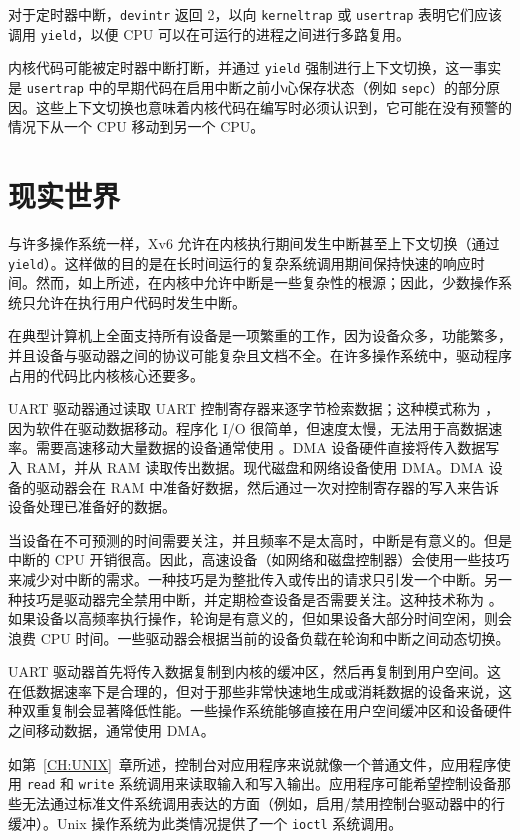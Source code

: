 对于定时器中断，{\tt devintr} 返回 2，以向 {\tt kerneltrap} 或 {\tt usertrap} 表明它们应该调用 {\tt yield}，以便 CPU 可以在可运行的进程之间进行多路复用。

内核代码可能被定时器中断打断，并通过 {\tt yield} 强制进行上下文切换，这一事实是 {\tt usertrap} 中的早期代码在启用中断之前小心保存状态（例如 {\tt sepc}）的部分原因。这些上下文切换也意味着内核代码在编写时必须认识到，它可能在没有预警的情况下从一个 CPU 移动到另一个 CPU。

\section{现实世界}

与许多操作系统一样，Xv6 允许在内核执行期间发生中断甚至上下文切换（通过 {\tt yield}）。这样做的目的是在长时间运行的复杂系统调用期间保持快速的响应时间。然而，如上所述，在内核中允许中断是一些复杂性的根源；因此，少数操作系统只允许在执行用户代码时发生中断。

在典型计算机上全面支持所有设备是一项繁重的工作，因为设备众多，功能繁多，并且设备与驱动器之间的协议可能复杂且文档不全。在许多操作系统中，驱动程序占用的代码比内核核心还要多。

UART 驱动器通过读取 UART 控制寄存器来逐字节检索数据；这种模式称为 ，因为软件在驱动数据移动。程序化 I/O 很简单，但速度太慢，无法用于高数据速率。需要高速移动大量数据的设备通常使用 。DMA 设备硬件直接将传入数据写入 RAM，并从 RAM 读取传出数据。现代磁盘和网络设备使用 DMA。DMA 设备的驱动器会在 RAM 中准备好数据，然后通过一次对控制寄存器的写入来告诉设备处理已准备好的数据。

当设备在不可预测的时间需要关注，并且频率不是太高时，中断是有意义的。但是中断的 CPU 开销很高。因此，高速设备（如网络和磁盘控制器）会使用一些技巧来减少对中断的需求。一种技巧是为整批传入或传出的请求只引发一个中断。另一种技巧是驱动器完全禁用中断，并定期检查设备是否需要关注。这种技术称为 。如果设备以高频率执行操作，轮询是有意义的，但如果设备大部分时间空闲，则会浪费 CPU 时间。一些驱动器会根据当前的设备负载在轮询和中断之间动态切换。

UART 驱动器首先将传入数据复制到内核的缓冲区，然后再复制到用户空间。这在低数据速率下是合理的，但对于那些非常快速地生成或消耗数据的设备来说，这种双重复制会显著降低性能。一些操作系统能够直接在用户空间缓冲区和设备硬件之间移动数据，通常使用 DMA。

如第~\ref{CH:UNIX}~章所述，控制台对应用程序来说就像一个普通文件，应用程序使用 \lstinline{read} 和 \lstinline{write} 系统调用来读取输入和写入输出。应用程序可能希望控制设备那些无法通过标准文件系统调用表达的方面（例如，启用/禁用控制台驱动器中的行缓冲）。Unix 操作系统为此类情况提供了一个 \lstinline{ioctl} 系统调用。

